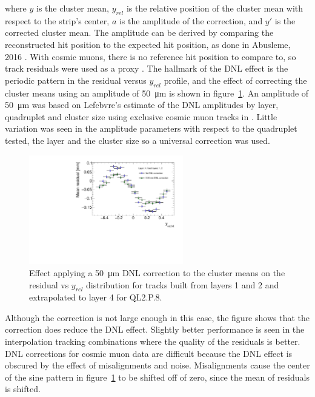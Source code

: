 where $y$ is the cluster mean, $y_{rel}$ is the relative position of the cluster mean with respect to the strip's center, $a$ is the amplitude of the correction, and $y'$ is the corrected cluster mean. The amplitude can be derived by comparing the reconstructed hit position to the expected hit position, as done in Abusleme, 2016 \cite{abusleme_performance_2016}. With cosmic muons, there is no reference hit position to compare to, so track residuals were used as a proxy \cite{lefebvre_thesis}. The hallmark of the DNL effect is the periodic pattern in the residual versus $y_{rel}$ profile, and the effect of correcting the cluster means using an amplitude of \SI{50}{\micro\meter} is shown in figure~\ref{fig:dnl_corr_effect}. An amplitude of \SI{50}{\micro\meter} was based on Lefebvre's estimate of the DNL amplitudes by layer, quadruplet and cluster size using exclusive cosmic muon tracks in . Little variation was seen in the amplitude parameters with respect to the quadruplet tested, the layer and the cluster size so a universal correction was used.

\begin{figure}
    \centering
    \includegraphics[width = 0.6\textwidth]{figures/figure_dnl_profiles_blue_QL2P08_3100V_2021-06-18_no_dnl_green_QL2P08_3100V_2021-06-18_2_50um_universal_DNL_layer4_fixed12.pdf}
    \caption{Effect applying a \SI{50}{\micro\meter} DNL correction to the cluster means on the residual vs $y_{rel}$ distribution for tracks built from layers 1 and 2 and extrapolated to layer 4 for QL2.P.8.}
    \label{fig:dnl_corr_effect}
\end{figure} 

Although the correction is not large enough in this case, the figure shows that the correction does reduce the DNL effect. Slightly better performance is seen in the interpolation tracking combinations where the quality of the residuals is better. DNL corrections for cosmic muon data are difficult because the DNL effect is obscured by the effect of misalignments and noise. Misalignments cause the center of the sine pattern in figure~\ref{fig:dnl_corr_effect} to be shifted off of zero, since the mean of residuals is shifted.

